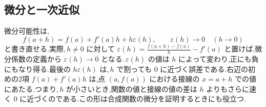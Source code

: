 \subsection{微分と一次近似}
微分可能性は,
\[
 f(a+h)=f(a)+f'(a)h+h\varepsilon(h),
 \qquad \varepsilon(h)\to0\quad(h\to0)
\]
と書き直せる.実際,\,$h\ne0$ に対して $\varepsilon(h)=\frac{f(a+h)-f(a)}h-f'(a)$ と置けば,微分係数の定義から $\varepsilon(h)\to0$ となる.\,$\varepsilon(h)$ の値は $h$ によって変わり,正にも負にもなり得る.最後の $h\varepsilon(h)$ は,\,$h$ で割っても $0$ に近づく誤差である.右辺の初めの2項 $f(a)+f'(a)h$ は,点 $(a,f(a))$ における接線の $x=a+h$ での値にあたる.つまり,\,$h$ が小さいとき,関数の値と接線の値の差は $h$ よりもさらに速く $0$ に近づくのである.この形は合成関数の微分を証明するときにも役立つ.
